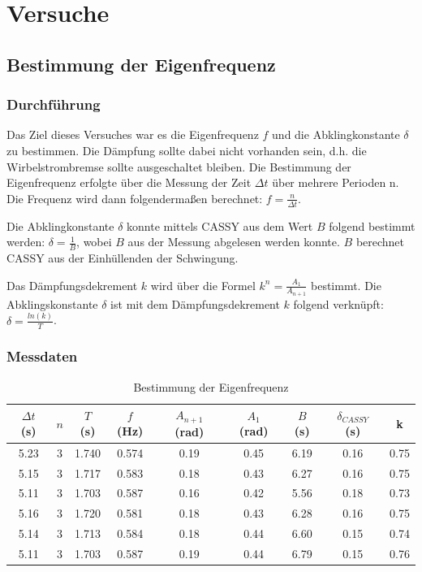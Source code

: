\documentclass{article}
\begin{document}
\section{Versuche}
\subsection{Bestimmung der Eigenfrequenz} \label{ssec:eigenfrequenz}
\subsubsection{Durchführung}
Das Ziel dieses Versuches war es die Eigenfrequenz $f$ und die Abklingkonstante $\delta$ zu
bestimmen. Die Dämpfung sollte dabei nicht vorhanden sein, d.h. die Wirbelstrombremse
sollte ausgeschaltet bleiben. Die Bestimmung der Eigenfrequenz erfolgte über
die Messung der Zeit $\Delta t$ über mehrere Perioden n. Die Frequenz wird dann
folgendermaßen berechnet: $f = \frac{n}{\Delta t}$.

Die Abklingkonstante $\delta$ konnte mittels CASSY aus dem Wert $B$ folgend
bestimmt werden: $\delta = \frac{1}{B}$, wobei $B$ aus der Messung abgelesen werden konnte. $B$ berechnet CASSY aus der
Einhüllenden der Schwingung.

Das Dämpfungsdekrement $k$ wird über die Formel $k^n = \frac{A_1}{A_{n+1}}$ bestimmt. Die Abklingskonstante $\delta$ ist
mit dem Dämpfungsdekrement $k$ folgend verknüpft: $\delta = \frac{ln(k)}{T}$.
\subsubsection{Messdaten}
\begin{table}[H]
    \centering
    \begin{tabular}{|c|c|c|c|c|c|c|c|c|}
    \hline
    $\Delta t$ (s) & $n$ & $T$ (s) & $f$ (Hz) & $A_{n+1}$ (rad) & $A_1$ (rad) & $B$ (s) & $\delta_{CASSY}$ (s) & k\\
    \hline
    5.23 & 3 & 1.740 & 0.574 & 0.19 & 0.45 & 6.19 & 0.16 & 0.75 \\
    5.15 & 3 & 1.717 & 0.583 & 0.18 & 0.43 & 6.27 & 0.16 & 0.75 \\
    5.11 & 3 & 1.703 & 0.587 & 0.16 & 0.42 & 5.56 & 0.18 & 0.73 \\
    5.16 & 3 & 1.720 & 0.581 & 0.18 & 0.43 & 6.28 & 0.16 & 0.75 \\
    5.14 & 3 & 1.713 & 0.584 & 0.18 & 0.44 & 6.60 & 0.15 & 0.74 \\
    5.11 & 3 & 1.703 & 0.587 & 0.19 & 0.44 & 6.79 & 0.15 & 0.76 \\
    \hline
    \end{tabular}
    \caption{Bestimmung der Eigenfrequenz}
    \label{tab:eigenfrequenz}
\end{table}
\end{document}
